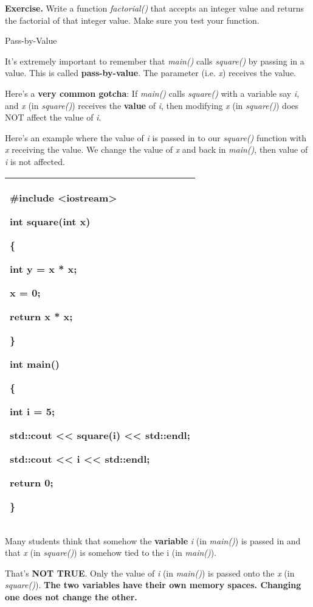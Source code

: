 \documentclass[
]{article}
\begin{document}
\textbf{Exercise.} Write a function \emph{factorial()} that accepts an
integer value and returns the factorial of that integer value. Make sure
you test your function.

Pass-by-Value

It's extremely important to remember that \emph{main()} calls
\emph{square()} by passing in a value. This is called
\textbf{pass-by-value}. The parameter (i.e. \emph{x}) receives the
value.

Here's a \textbf{very common gotcha}: If \emph{main()} calls
\emph{square()} with a variable say \emph{i}, and \emph{x} (in
\emph{square()}) receives the \textbf{value} of \emph{i}, then modifying
\emph{x} (in \emph{square()}) does NOT affect the value of \emph{i}.

Here's an example where the value of \emph{i} is passed in to our
\emph{square()} function with \emph{x} receiving the value. We change
the value of \emph{x} and back in \emph{main()}, then value of \emph{i}
is not affected.

\begin{longtable}[]{@{}l@{}}
\toprule
\endhead
\begin{minipage}[t]{0.97\columnwidth}\raggedright
\#include \textless iostream\textgreater{}

int square(int x)

\{

int y = x * x;

x = 0;

return x * x;

\}

int main()

\{

int i = 5;

std::cout \textless\textless{} square(i) \textless\textless{} std::endl;

std::cout \textless\textless{} i \textless\textless{} std::endl;

return 0;

\}\strut
\end{minipage}\tabularnewline
\bottomrule
\end{longtable}

Many students think that somehow the \textbf{variable} \emph{i} (in
\emph{main()}) is passed in and that \emph{x} (in \emph{square()}) is
somehow tied to the i (in \emph{main()}).

That's \textbf{NOT TRUE}. Only the value of \emph{i} (in \emph{main()})
is passed onto the \emph{x} (in \emph{square()}). \textbf{The two
variables have their own memory spaces. Changing one does not change the
other.}
\end{document}
